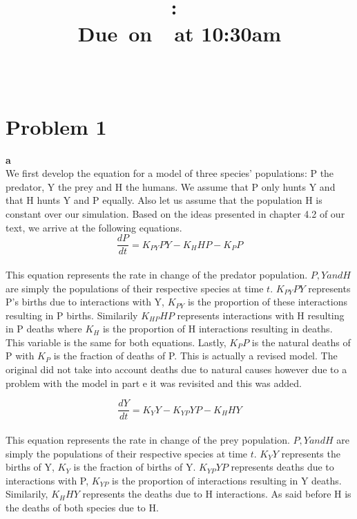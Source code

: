 \documentclass{article}
\title{
    \vspace{2in}
    \textmd{\textbf{\hmwkClass:\ \hmwkTitle}}\\
    \normalsize\vspace{0.1in}\small{Due\ on\ \hmwkDueDate\ at 10:30am}\\
    \vspace{0.1in}\large{\textit{\hmwkClassInstructor\ \hmwkClassTime}}
    \vspace{3in}
}
\author{\textbf{\hmwkAuthorName}}
\date{}
\begin{document}
\maketitle

\pagebreak
\vspace{.25cm}
\section*{Problem 1}

  \textbf{a}\\
  We first develop the equation for a model of three species' populations: P the predator,
  Y the prey and H the humans. We assume that P only hunts Y and that H hunts Y and P
  equally.  Also let us assume that the population H is constant over our simulation.
  Based on the ideas presented in chapter 4.2 of our text, we arrive
  at the following equations.\\

  \[
  \frac{dP}{dt} = K_{PY}PY - K_{H}HP - K_{P}P
  \]\\

  This equation represents the rate in change of the predator population. $P,Y and H$
  are simply the populations of their respective species at time $t$. $K_{PY}PY$ represents
  P's births due to interactions with Y, $K_{PY}$ is the proportion of these interactions
  resulting in P births. Similarily $K_{HP}HP$ represents interactions with H resulting
  in P deaths where $K_{H}$ is the proportion of H interactions resulting in deaths. This
  variable is the same for both equations.
  Lastly, $K_{P}P$ is the natural deaths of P with $K_{P}$ is the fraction of deaths of P.
  This is actually a revised model. The original did not take into account deaths due to
  natural causes however due to a problem with the model in part e it was revisited and
  this was added.

  \[
  \frac{dY}{dt} = K_{Y}Y - K_{YP}YP - K_{H}HY
  \]\\

  This equation represents the rate in change of the prey population. $P,Y and H$
  are simply the populations of their respective species at time $t$. $K_{Y}Y$
  represents the births of Y, $K_{Y}$ is the fraction of births of Y. $K_{YP}YP$
  represents deaths due to interactions with P, $K_{YP}$ is the proportion of interactions
  resulting in Y deaths. Similarily, $K_{H}HY$ represents the deaths due to H interactions.
  As said before H is the deaths of both species due to H. \\
\end{document}
